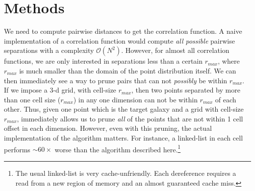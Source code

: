 \documentclass[preprint,authoryear,12pt]{elsarticle}
\newcommand{\rmax}{\ensuremath{{r_{max}}}\xspace}
\begin{document}
\section{Methods}
We need to compute pairwise distances to get the correlation function. A naive implementation of a correlation function would compute {\em all possible} 
pairwise separations with a complexity $\mathcal{O}(N^2)$. However, for almost all correlation functions, we are only interested in separations less than 
a certain \rmax, where \rmax is much smaller than the domain of the point distribution itself. We can then immediately see a way to prune pairs that can not
{\em possibly} be within \rmax. If we impose a 3-d grid, with cell-size \rmax, then two points separated by more than one cell size (\rmax) in any one 
dimension can not be within \rmax of each other. Thus, given one point which is the target galaxy and a grid with cell-size \rmax, 
immediately allows us to prune {\em all} of the points that are not within 1 cell offset in each dimension. However, even with this pruning, the actual 
implementation of the algorithm matters. For instance, a linked-list in each cell performs $\sim 60\times$ worse than the algorithm described here.\footnote{The 
usual linked-list is very cache-unfriendly. Each dereference requires a read from a new region of memory and an almost guaranteed cache miss. } 
\end{document}
